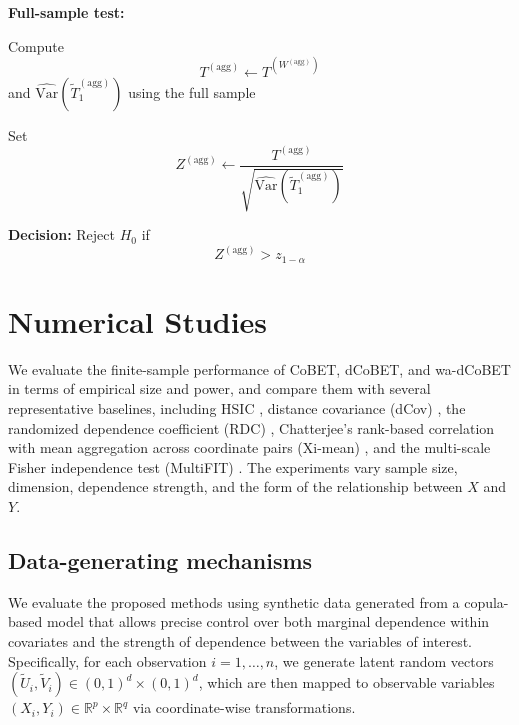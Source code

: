 \documentclass[12pt,reqno,oneside]{amsbook}
\theoremstyle{definition}
\theoremstyle{remark}
\begin{document}
\begin{algorithm}[htbp]
\begin{algorithmic}[1]
\Statex

\State \textbf{Full-sample test:}

\State Compute
\[
T^{(\mathrm{agg})}
\gets
T^{(W^{(\mathrm{agg})})}
\]
and
$\widehat{\mathrm{Var}}
(\widetilde{T}_1^{(\mathrm{agg})})$
using the full sample

\State Set
\[
Z^{(\mathrm{agg})}
\gets
\frac{
    T^{(\mathrm{agg})}
}{
    \sqrt{
        \widehat{\mathrm{Var}}
        (\widetilde{T}_1^{(\mathrm{agg})})
    }
}
\]

\Statex

\State \textbf{Decision:}
Reject $H_0$ if
\[
Z^{(\mathrm{agg})}>z_{1-\alpha}
\]

\end{algorithmic}
\end{algorithm}

\section{Numerical Studies}
\label{sec:experiments}

We evaluate the finite-sample performance of CoBET, dCoBET, and wa-dCoBET in
terms of empirical size and power, and compare them with several representative
baselines, including HSIC \cite{Gretton2012AKT}, distance covariance (dCov)
\cite{Szekely2007}, the randomized dependence coefficient (RDC)
\cite{LopezPaz2017}, Chatterjee's rank-based correlation with mean aggregation
across coordinate pairs (Xi-mean) \cite{Chatterjee2021}, and the
multi-scale Fisher independence test (MultiFIT) \cite{Gorsky2022}. The
experiments vary sample size, dimension, dependence strength, and the form of
the relationship between $X$ and $Y$.


\subsection{Data-generating mechanisms}
\label{subsec:dgm}

We evaluate the proposed methods using synthetic data generated from a
copula-based model that allows precise control over both marginal dependence
within covariates and the strength of dependence between the variables of
interest. Specifically, for each observation $i=1,\ldots,n$, we generate latent
random vectors $(\tilde U_i,\tilde V_i)\in(0,1)^d\times(0,1)^d$, which are then
mapped to observable variables $(X_i,Y_i)\in\mathbb{R}^p\times\mathbb{R}^q$ via
coordinate-wise transformations.
\end{document}

